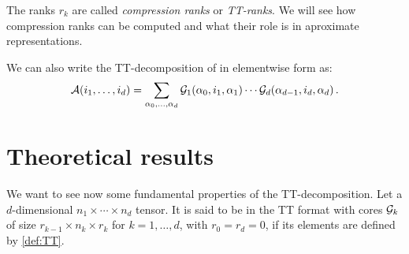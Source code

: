 The ranks $r_k$ are called \emph{compression ranks} or \emph{TT-ranks}. We will see how compression ranks can be computed and what their role is in aproximate representations.

We can also write the TT-decomposition of \A in elementwise form as:
\begin{equation} \label{def:TTindex}
  \mathcal{A}(i_1,\dots,i_d) = \sum_{\alpha_0,\dots,\alpha_d} \mathcal{G}_1(\alpha_0,i_1,\alpha_1) \cdots \mathcal{G}_d(\alpha_{d-1},i_d,\alpha_d)\, .
\end{equation}

\section{Theoretical results}
We want to see now some fundamental properties of the TT-decomposition. Let \A a $d$-dimensional $n_1 \times \cdots \times n_d$ tensor. It is said to be in the TT format with cores $\mathcal{G}_k$ of size $r_{k-1} \times n_k \times r_k$ for $k=1,\ldots ,d$, with $r_0 = r_d = 0$, if its elements are defined by \eqref{def:TT}.

